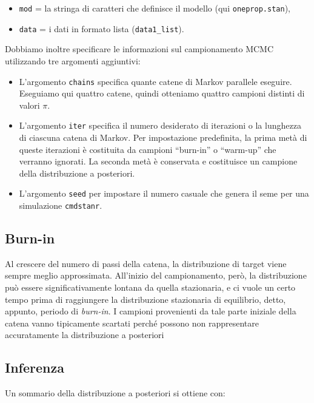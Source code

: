 \documentclass[
  11pt,
]{krantz}
\providecommand{\tightlist}{%
  \setlength{\itemsep}{0pt}\setlength{\parskip}{0pt}}
\theoremstyle{definition}
\theoremstyle{definition}
\theoremstyle{definition}
\theoremstyle{definition}
\theoremstyle{remark}
\begin{document}
\begin{itemize}
\tightlist
\item
  \texttt{mod} = la stringa di caratteri che definisce il modello (qui \texttt{oneprop.stan}),
\item
  \texttt{data} = i dati in formato lista (\texttt{data1\_list}).
\end{itemize}

Dobbiamo inoltre specificare le informazioni sul campionamento MCMC utilizzando tre argomenti aggiuntivi:

\begin{itemize}
\tightlist
\item
  L'argomento \texttt{chains} specifica quante catene di Markov parallele eseguire. Eseguiamo qui quattro catene, quindi otteniamo quattro campioni distinti di valori \(\pi\).
\item
  L'argomento \texttt{iter} specifica il numero desiderato di iterazioni o la lunghezza di ciascuna catena di Markov. Per impostazione predefinita, la prima metà di queste iterazioni è costituita da campioni ``burn-in'' o ``warm-up'' che verranno ignorati. La seconda metà è conservata e costituisce un campione della distribuzione a posteriori.
\item
  L'argomento \texttt{seed} per impostare il numero casuale che genera il seme per una simulazione \texttt{cmdstanr}.
\end{itemize}

\hypertarget{burn-in}{%
\subsection{Burn-in}\label{burn-in}}

Al crescere del numero di passi della catena, la distribuzione di target viene sempre meglio approssimata. All'inizio del campionamento, però, la distribuzione può essere significativamente lontana da quella stazionaria, e ci vuole un certo tempo prima di raggiungere la distribuzione stazionaria di equilibrio, detto, appunto, periodo di \emph{burn-in}. I campioni provenienti da tale parte iniziale della catena vanno tipicamente scartati perché possono non rappresentare accuratamente la distribuzione a posteriori

\hypertarget{inferenza}{%
\subsection{Inferenza}\label{inferenza}}

Un sommario della distribuzione a posteriori si ottiene con:
\end{document}
